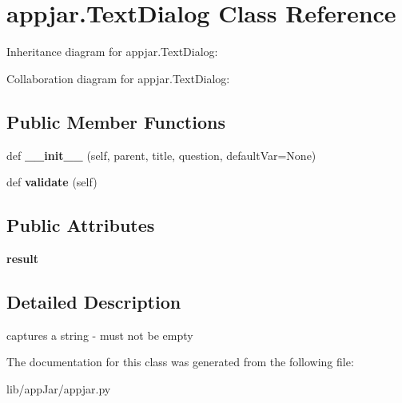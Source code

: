 \hypertarget{classappjar_1_1_text_dialog}{}\section{appjar.\+Text\+Dialog Class Reference}
\label{classappjar_1_1_text_dialog}


Inheritance diagram for appjar.\+Text\+Dialog\+:


Collaboration diagram for appjar.\+Text\+Dialog\+:
\subsection*{Public Member Functions}
\begin{DoxyCompactItemize}
\item 
\mbox{\label{classappjar_1_1_text_dialog_a60cf0d9064fd91e3f90ecb9ede4ebb65}} 
def {\bfseries \+\_\+\+\_\+init\+\_\+\+\_\+} (self, parent, title, question, default\+Var=None)
\item 
\mbox{\label{classappjar_1_1_text_dialog_afc9a6a171ebf18cc0c544b8d42fa0605}} 
def {\bfseries validate} (self)
\end{DoxyCompactItemize}
\subsection*{Public Attributes}
\begin{DoxyCompactItemize}
\item 
\mbox{\label{classappjar_1_1_text_dialog_ad660dedf184851be270bbef676329833}} 
{\bfseries result}
\end{DoxyCompactItemize}


\subsection{Detailed Description}
\begin{DoxyVerb}captures a string - must not be empty \end{DoxyVerb}
 

The documentation for this class was generated from the following file\+:\begin{DoxyCompactItemize}
\item 
lib/app\+Jar/appjar.\+py\end{DoxyCompactItemize}
